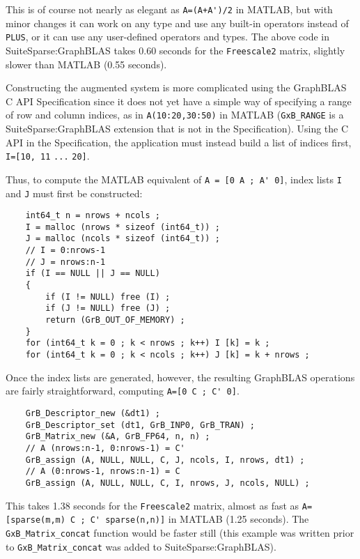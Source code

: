 \documentclass[12pt]{article}
\begin{document}
This is of course not nearly as elegant as \verb"A=(A+A')/2" in MATLAB, but
with minor changes it can work on any type and use any built-in operators
instead of \verb'PLUS', or it can use any user-defined operators and types.
The above code in SuiteSparse:GraphBLAS takes 0.60 seconds for the
\verb'Freescale2' matrix, slightly slower than MATLAB (0.55 seconds).

Constructing the augmented system is more complicated using the GraphBLAS C API
Specification since it does not yet have a simple way of specifying a range of
row and column indices, as in \verb'A(10:20,30:50)' in MATLAB (\verb'GxB_RANGE'
is a SuiteSparse:GraphBLAS extension that is not in the Specification).  Using
the C API in the Specification, the application must instead build a list of
indices first, \verb'I=[10, 11' \verb'...' \verb'20]'.

Thus, to compute the MATLAB equivalent of \verb"A = [0 A ; A' 0]", index lists
\verb'I' and \verb'J' must first be constructed:

    \vspace{-0.05in}
    {\footnotesize
    \begin{verbatim}
    int64_t n = nrows + ncols ;
    I = malloc (nrows * sizeof (int64_t)) ;
    J = malloc (ncols * sizeof (int64_t)) ;
    // I = 0:nrows-1
    // J = nrows:n-1
    if (I == NULL || J == NULL)
    {
        if (I != NULL) free (I) ;
        if (J != NULL) free (J) ;
        return (GrB_OUT_OF_MEMORY) ;
    }
    for (int64_t k = 0 ; k < nrows ; k++) I [k] = k ;
    for (int64_t k = 0 ; k < ncols ; k++) J [k] = k + nrows ; \end{verbatim}}

Once the index lists are generated, however, the resulting GraphBLAS operations
are fairly straightforward, computing \verb"A=[0 C ; C' 0]".

    \vspace{-0.05in}
    {\footnotesize
    \begin{verbatim}
    GrB_Descriptor_new (&dt1) ;
    GrB_Descriptor_set (dt1, GrB_INP0, GrB_TRAN) ;
    GrB_Matrix_new (&A, GrB_FP64, n, n) ;
    // A (nrows:n-1, 0:nrows-1) = C'
    GrB_assign (A, NULL, NULL, C, J, ncols, I, nrows, dt1) ;
    // A (0:nrows-1, nrows:n-1) = C
    GrB_assign (A, NULL, NULL, C, I, nrows, J, ncols, NULL) ; \end{verbatim}}

This takes 1.38 seconds for the \verb'Freescale2' matrix, almost as fast as \newline
\verb"A=[sparse(m,m) C ; C' sparse(n,n)]" in MATLAB (1.25 seconds).
The \verb'GxB_Matrix_concat' function would be faster still (this example
was written prior to \verb'GxB_Matrix_concat' was added to SuiteSparse:GraphBLAS).
\end{document}
